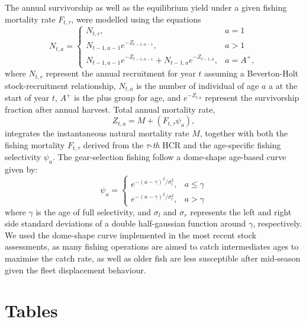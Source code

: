 \documentclass[11pt,letterpaper,]{article}
\begin{document}
The annual survivorship as well as the equilibrium 
yield under a given fishing mortality rate $F_{t,\tau}$, were modelled 
using the equations
\[ 
N_{t,a}=\begin{cases} N_{t,r}, & a=1\\
N_{t-1,a-1}e^{-Z_{t-1,a-1}},& a>1\\
N_{t-1,a-1}e^{-Z_{t-1,a-1}} + N_{t-1,a}e^{-Z_{t-1,a}},& a=A^+,
\end{cases}  
\]
where $N_{t,r}$ represent the annual recruitment for year $t$ 
assuming a Beverton-Holt stock-recruitment relationship,  
$N_{t,a}$ is the number of individual 
of age $a$ a at the start of year $t$, $A^+$ is the plus group for age, and $e^{-Z_{t,a}}$ represent
the survivorship fraction after annual harvest. 
Total annual mortality rate,
\[ 
Z_{t,a}= M+\left( F_{t,\tau}\psi_{a}\right), 
\]
integrates the instantaneous 
natural mortality rate $M$, together with both the fishing mortality $F_{t,\tau}$
derived from the $\tau$-\textit{th} HCR and the age-specific 
fishing selectivity $\psi_a$. The gear-selection fishing follow a dome-shape age-based curve given by:
\[ 
\psi_{a}=\begin{cases}e^{-(a-\gamma)^2 / \sigma^{2}_l}, & a\leq \gamma\\
e^{-(a-\gamma)^2 / \sigma^{2}_r}, & a > \gamma
\end{cases}  
\]
where $\gamma$ is the age of full selectivity, and $\sigma_l$ and 
$\sigma_r$ represents the left and right side standard deviations 
of a double half-gaussian function around $\gamma$, respectively. We used the dome-shape curve implemented in the most recent stock assessments, as many fishing operations are aimed to catch intermediates ages to maximise the catch rate, as well as  older fish are less susceptible after mid-season given the fleet displacement behaviour.

\clearpage

\section{Tables}
\end{document}
